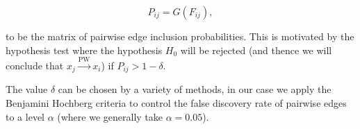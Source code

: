 \documentclass[12pt]{article}
\def\pwgc{\overset{\text{PW}}{\rightarrow}}  %
\begin{document}
\begin{equation}
  \label{eqn:edge_inclusion_probability}
  P_{ij} = G(F_{ij}),
\end{equation}

to be the matrix of pairwise edge inclusion probabilities.  This is
motivated by the hypothesis test where the hypothesis $H_0$ will be
rejected (and thence we will conclude that $x_j \pwgc x_i$) if
$P_{ij} > 1 - \delta$.

The value $\delta$ can be chosen by a variety of methods, in our case
we apply the Benjamini Hochberg criteria \cite{benjamini_hochberg}
\cite{all_of_statistics} to control the false discovery rate of
pairwise edges to a level $\alpha$ (where we generally take
$\alpha = 0.05$).







\end{document}
